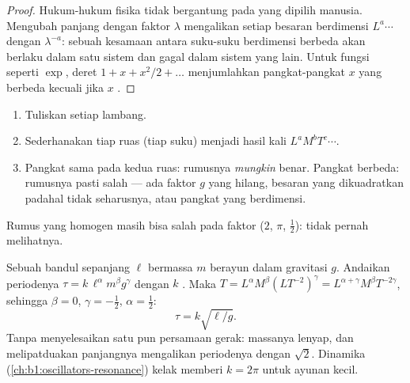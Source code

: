 \begin{proof}
Hukum-hukum fisika tidak bergantung pada  yang dipilih manusia.
Mengubah  panjang dengan faktor $\lambda$ mengalikan setiap
besaran berdimensi $L^a \cdots$ dengan $\lambda^{-a}$: sebuah kesamaan
antara suku-suku berdimensi berbeda akan berlaku dalam satu sistem
 dan gagal dalam sistem yang lain. Untuk fungsi seperti $\exp$,
deret $1 + x + x^2/2 + \dots$ menjumlahkan pangkat-pangkat $x$ yang
berbeda  kecuali jika $x$ .
\end{proof}

\begin{method}\label{met:b1:units-dimensions:check}
\begin{enumerate}
  \item Tuliskan  setiap lambang.
  \item Sederhanakan tiap ruas (tiap suku) menjadi hasil kali
        $L^a M^b T^c \cdots$.
  \item Pangkat sama pada kedua ruas: rumusnya \emph{mungkin} benar.
        Pangkat berbeda: rumusnya pasti salah --- ada faktor $g$ yang
        hilang, besaran yang dikuadratkan padahal tidak seharusnya,
        atau pangkat yang berdimensi.
\end{enumerate}
Rumus yang homogen masih bisa salah pada faktor 
($2$, $\pi$, $\tfrac12$):  tidak pernah melihatnya.
\end{method}

\begin{example}\label{ex:b1:units-dimensions:pendulum}
Sebuah bandul sepanjang $\ell$ bermassa $m$ berayun dalam gravitasi
$g$. Andaikan periodenya $\tau = k\,\ell^\alpha m^\beta g^\gamma$
dengan $k$ . Maka $T = L^\alpha M^\beta (L T^{-2})^\gamma =
L^{\alpha+\gamma} M^\beta T^{-2\gamma}$, sehingga $\beta = 0$,
$\gamma = -\tfrac12$, $\alpha = \tfrac12$:
\[
\tau = k\sqrt{\ell/g} .
\]
Tanpa menyelesaikan satu pun persamaan gerak: massanya lenyap, dan
melipatduakan panjangnya mengalikan periodenya dengan $\sqrt2$. Dinamika
(\cref{ch:b1:oscillators-resonance}) kelak memberi $k = 2\pi$ untuk
ayunan kecil.
\end{example}

